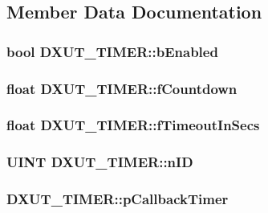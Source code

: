 \subsection{Member Data Documentation}
\hypertarget{struct_d_x_u_t___t_i_m_e_r_a751d6b0959c550a79993ac467416ab87}{
\subsubsection[{bEnabled}]{\setlength{\rightskip}{0pt plus 5cm}bool {\bf DXUT\_\-TIMER::bEnabled}}}
\label{struct_d_x_u_t___t_i_m_e_r_a751d6b0959c550a79993ac467416ab87}
\hypertarget{struct_d_x_u_t___t_i_m_e_r_a792bef915749e62ee6cabd06f9e5c722}{
\subsubsection[{fCountdown}]{\setlength{\rightskip}{0pt plus 5cm}float {\bf DXUT\_\-TIMER::fCountdown}}}
\label{struct_d_x_u_t___t_i_m_e_r_a792bef915749e62ee6cabd06f9e5c722}
\hypertarget{struct_d_x_u_t___t_i_m_e_r_aa40bd49701003a16a462639b5e491d3f}{
\subsubsection[{fTimeoutInSecs}]{\setlength{\rightskip}{0pt plus 5cm}float {\bf DXUT\_\-TIMER::fTimeoutInSecs}}}
\label{struct_d_x_u_t___t_i_m_e_r_aa40bd49701003a16a462639b5e491d3f}
\hypertarget{struct_d_x_u_t___t_i_m_e_r_a20ce9c19ffc97821df8b048541a01348}{
\subsubsection[{nID}]{\setlength{\rightskip}{0pt plus 5cm}UINT {\bf DXUT\_\-TIMER::nID}}}
\label{struct_d_x_u_t___t_i_m_e_r_a20ce9c19ffc97821df8b048541a01348}
\hypertarget{struct_d_x_u_t___t_i_m_e_r_aebbdf57604305732406ad29ae90214f0}{
\subsubsection[{pCallbackTimer}]{ {\bf DXUT\_\-TIMER::pCallbackTimer}}}
